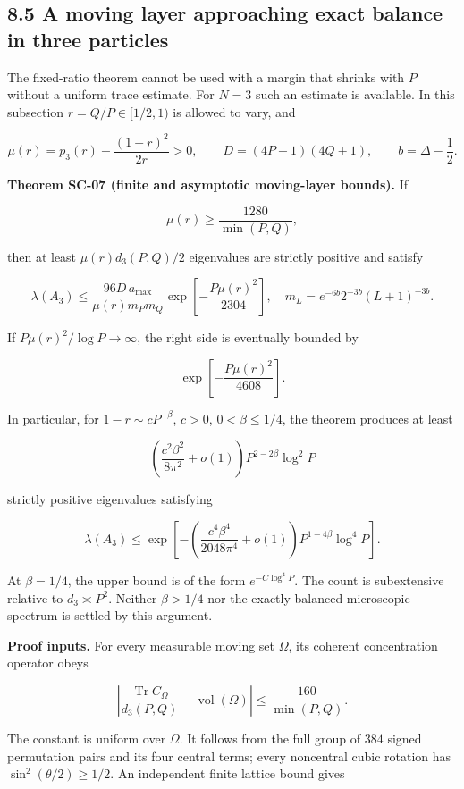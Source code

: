 \hypertarget{a-moving-layer-approaching-exact-balance-in-three-particles}{%
\subsection{8.5 A moving layer approaching exact balance in three particles}\label{a-moving-layer-approaching-exact-balance-in-three-particles}}

The fixed-ratio theorem cannot be used with a margin that shrinks with \(P\) without a uniform trace estimate. For \(N=3\) such an estimate is available. In this subsection \(r=Q/P\in[1/2,1)\) is allowed to vary, and

\[
\mu(r)=p_3(r)-\frac{(1-r)^2}{2r}>0,\qquad
D=(4P+1)(4Q+1),\qquad b=\Delta-\frac12.
\]

\textbf{Theorem SC-07 (finite and asymptotic moving-layer bounds).} If

\[
\mu(r)\geq\frac{1280}{\min(P,Q)},
\]

then at least \(\mu(r)d_3(P,Q)/2\) eigenvalues are strictly positive and satisfy

\[
\lambda(A_3)\leq
\frac{96D\,a_{\max}}{\mu(r)m_Pm_Q}
\exp\!\left[-\frac{P\mu(r)^2}{2304}\right],
\quad m_L=e^{-6b}2^{-3b}(L+1)^{-3b}.
\]

If \(P\mu(r)^2/\log P\to\infty\), the right side is eventually bounded by

\[
\exp\!\left[-\frac{P\mu(r)^2}{4608}\right].
\]

In particular, for \(1-r\sim cP^{-\beta}\), \(c>0\), \(0<\beta\leq1/4\), the theorem produces at least

\[
\left(\frac{c^2\beta^2}{8\pi^2}+o(1)\right)
P^{2-2\beta}\log^2P
\]

strictly positive eigenvalues satisfying

\[
\lambda(A_3)\leq
\exp\!\left[-\left(\frac{c^4\beta^4}{2048\pi^4}+o(1)\right)
P^{1-4\beta}\log^4P\right].
\]

At \(\beta=1/4\), the upper bound is of the form \(e^{-C\log^4P}\). The count is subextensive relative to \(d_3\asymp P^2\). Neither \(\beta>1/4\) nor the exactly balanced microscopic spectrum is settled by this argument.

\textbf{Proof inputs.} For every measurable moving set \(\Omega\), its coherent concentration operator obeys

\[
\left|\frac{\operatorname{Tr}C_\Omega}{d_3(P,Q)}-\operatorname{vol}(\Omega)\right|
\leq\frac{160}{\min(P,Q)}.
\]

The constant is uniform over \(\Omega\). It follows from the full group of \(384\) signed permutation pairs and its four central terms; every noncentral cubic rotation has \(\sin^2(\theta/2)\geq1/2\). An independent finite lattice bound gives

